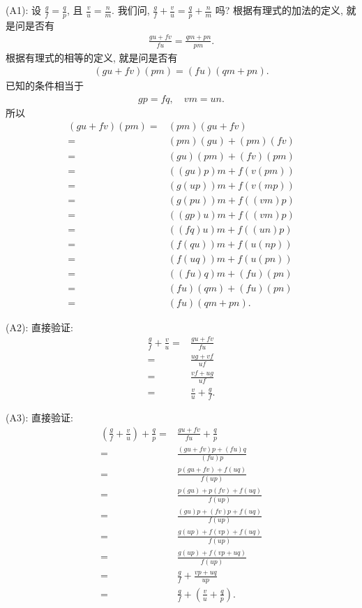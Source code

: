 (A1): 设 $\frac{g}{f} = \frac{q}{p}$, 且 $\frac{v}{u} = \frac{n}{m}$. 我们问, $\frac{g}{f} + \frac{v}{u} = \frac{q}{p} + \frac{n}{m}$ 吗? 根据有理式的加法的定义, 就是问是否有
\begin{align*}
    \frac{gu + fv}{fu} = \frac{qm + pn}{pm}.
\end{align*}
根据有理式的相等的定义, 就是问是否有
\begin{align*}
    (gu + fv)(pm) = (fu)(qm + pn).
\end{align*}
已知的条件相当于
\begin{align*}
    gp = fq, \quad vm = un.
\end{align*}
所以
\begin{align*}
    (gu + fv)(pm)
    = {} & (pm)(gu + fv)       \\
    = {} & (pm)(gu) + (pm)(fv) \\
    = {} & (gu)(pm) + (fv)(pm) \\
    = {} & ((gu)p)m + f(v(pm)) \\
    = {} & (g(up))m + f(v(mp)) \\
    = {} & (g(pu))m + f((vm)p) \\
    = {} & ((gp)u)m + f((vm)p) \\
    = {} & ((fq)u)m + f((un)p) \\
    = {} & (f(qu))m + f(u(np)) \\
    = {} & (f(uq))m + f(u(pn)) \\
    = {} & ((fu)q)m + (fu)(pn) \\
    = {} & (fu)(qm) + (fu)(pn) \\
    = {} & (fu)(qm + pn).
\end{align*}

(A2): 直接验证:
\begin{align*}
    \frac{g}{f} + \frac{v}{u}
    = {} & \frac{gu + fv}{fu}         \\
    = {} & \frac{ug + vf}{uf}         \\
    = {} & \frac{vf + ug}{uf}         \\
    = {} & \frac{v}{u} + \frac{g}{f}.
\end{align*}

(A3): 直接验证:
\begin{align*}
    \left( \frac{g}{f} + \frac{v}{u} \right) + \frac{q}{p}
    = {} & \frac{gu + fv}{fu} + \frac{q}{p}                        \\
    = {} & \frac{(gu + fv)p + (fu)q}{(fu)p}                        \\
    = {} & \frac{p(gu + fv) + f(uq)}{f(up)}                        \\
    = {} & \frac{p(gu) + p(fv) + f(uq)}{f(up)}                     \\
    = {} & \frac{(gu)p + (fv)p + f(uq)}{f(up)}                     \\
    = {} & \frac{g(up) + f(vp) + f(uq)}{f(up)}                     \\
    = {} & \frac{g(up) + f(vp + uq)}{f(up)}                        \\
    = {} & \frac{g}{f} + \frac{vp + uq}{up}                        \\
    = {} & \frac{g}{f} + \left( \frac{v}{u} + \frac{q}{p} \right).
\end{align*}


